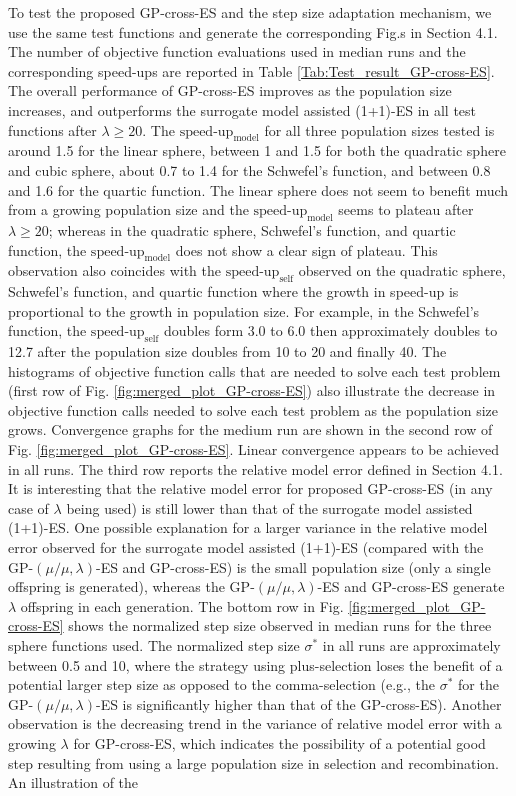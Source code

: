 To test the proposed GP-cross-ES and the step size adaptation mechanism, we use the same test functions and generate the corresponding Fig.s in Section 4.1. The number of objective function evaluations used in median runs and the corresponding speed-ups are reported in Table \ref{Tab:Test_result_GP-cross-ES}. The overall performance of GP-cross-ES improves as the population size increases, and outperforms the surrogate model assisted (1+1)-ES \cite{DBLP:conf/ppsn/KayhaniA18} in all test functions after $\lambda\geq 20$. The $\text{speed-up}_{\text{model}}$ for all three population sizes tested is around 1.5 for the linear sphere, between 1 and 1.5 for both the quadratic sphere and cubic sphere, about 0.7 to 1.4 for the Schwefel's function, and between 0.8 and 1.6 for the quartic function. The linear sphere does not seem to benefit much from a growing population size and the $\text{speed-up}_{\text{model}}$ seems to plateau after $\lambda \geq 20$; whereas in the quadratic sphere, Schwefel's function, and quartic function, the $\text{speed-up}_{\text{model}}$ does not show a clear sign of plateau. This observation also coincides with the $\text{speed-up}_{\text{self}}$ observed on the quadratic sphere, Schwefel's function, and quartic function where the growth in speed-up is proportional to the growth in population size. For example, in the Schwefel's function, the $\text{speed-up}_{\text{self}}$ doubles form 3.0 to 6.0 then approximately doubles to 12.7 after the population size doubles from 10 to 20 and finally 40. The histograms of objective function calls that are needed to solve each test problem (first row of Fig. \ref{fig:merged_plot_GP-cross-ES}) also illustrate the decrease in objective function calls needed to solve each test problem as the population size grows. Convergence graphs for the medium run are shown in the second row of Fig. \ref{fig:merged_plot_GP-cross-ES}. Linear convergence appears to be achieved in all runs. The third row reports the relative model error defined in Section 4.1. It is interesting that the relative model error for proposed GP-cross-ES (in any case of $\lambda$ being used) is still lower than that of the surrogate model assisted (1+1)-ES. One possible explanation for a larger variance in the relative model error observed for the surrogate model assisted (1+1)-ES (compared with the GP-$(\mu/\mu,\lambda)$-ES and GP-cross-ES) is the small population size (only a single offspring is generated), whereas the GP-$(\mu/\mu,\lambda)$-ES and GP-cross-ES generate $\lambda$ offspring in each generation. The bottom row in Fig. \ref{fig:merged_plot_GP-cross-ES} shows the normalized step size observed in median runs for the three sphere functions used. The normalized step size $\sigma^*$ in all runs are approximately between 0.5 and 10, where the strategy using plus-selection loses the benefit of a potential larger step size as opposed to the comma-selection (e.g., the $\sigma^*$ for the GP-$(\mu/\mu,\lambda)$-ES is significantly higher than that of the GP-cross-ES). Another observation is the decreasing trend in the variance of relative model error with a growing $\lambda$ for GP-cross-ES, which indicates the possibility of a potential good step resulting from using a large population size in selection and recombination. An illustration of the 